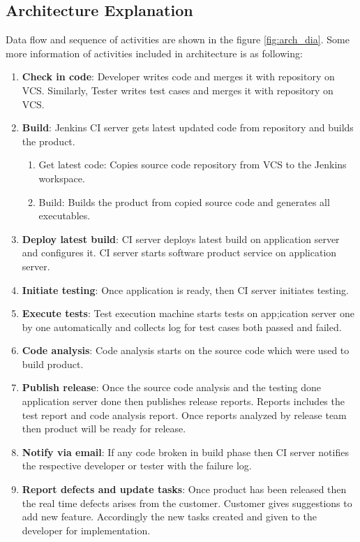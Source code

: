 \documentclass[a4paper,oneside,1,english1pt]{report}
\begin{document}
\subsection{Architecture Explanation}
	Data flow and sequence of activities are shown in the figure \ref{fig:arch_dia}. Some more information of activities included in architecture is  as following:
\begin{enumerate}
	\item \textbf{Check in code}:
	Developer writes code and merges it with repository on \ac{VCS}. Similarly, Tester writes test cases and merges it with repository on \ac{VCS}.
	
	\item \textbf{Build}: Jenkins \ac{CI} server gets latest updated code from repository and builds the product.
	\begin{enumerate}
		\item Get latest code: Copies source code repository from \ac{VCS} to the Jenkins workspace.
		\item Build: Builds the product from copied source code and generates all executables.
	\end{enumerate}
	
	\item \textbf{Deploy latest build}: \ac{CI} server deploys latest build on application server and configures it. \ac{CI} server starts  software product service on application server.
	
	\item \textbf{Initiate testing}: Once application is ready, then \ac{CI} server initiates testing. 
	
	\item \textbf{Execute tests}: Test execution machine  starts tests on app;ication server one by one automatically and collects log for test cases both passed and failed.
	
	\item \textbf{Code analysis}: Code analysis starts on the source code which were used to build product.
	
	
	\item \textbf{Publish release}:
	Once the source code analysis and the testing done application server done then publishes release reports. Reports includes the test report and code analysis report. Once reports analyzed by release team then product will be ready for release.
	
	\item \textbf{Notify via email}:
		If any code broken in build phase then \ac{CI} server notifies the respective developer or tester with the failure log.
	\item \textbf{Report defects and update tasks}:
		Once product has been released then the real time defects arises from the customer. Customer gives suggestions to add new feature. Accordingly the new tasks created and given to the developer for implementation.
\end{enumerate}
\end{document}
